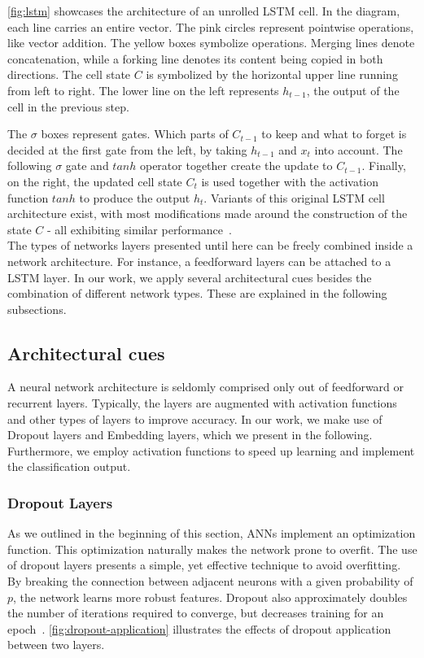 \autoref{fig:lstm} showcases the architecture of an unrolled LSTM cell. In the diagram, each line carries an entire vector. The pink circles represent pointwise operations, like vector addition. The yellow boxes symbolize operations. Merging lines denote concatenation, while a forking line denotes its content being copied in both directions. The cell state $C$ is symbolized by the horizontal upper line running from left to right. The lower line on the left represents $h_{t-1}$, the output of the cell in the previous step.

The $\sigma$ boxes represent gates. Which parts of $C_{t-1}$ to keep and what to forget is decided at the first gate from the left, by taking $h_{t-1}$ and $x_t$ into account. The following $\sigma$ gate and $tanh$ operator together create the update to $C_{t-1}$. Finally, on the right, the updated cell state $C_t$ is used together with the activation function $tanh$ to produce the output $h_t$. Variants of this original LSTM cell architecture exist, with most modifications made around the construction of the state $C$ - all exhibiting similar performance~\cite{greff2017lstm}.\\

The types of networks layers presented until here can be freely combined inside a network architecture.
For instance, a feedforward layers can be attached to a LSTM layer.
In our work, we apply several architectural cues besides the combination of different network types.
These are explained in the following subsections.

\subsection{Architectural cues}\label{sec:bacground:cues}
A neural network architecture is seldomly comprised only out of feedforward or recurrent layers.
Typically, the layers are augmented with activation functions and other types of layers to improve accuracy.
In our work, we make use of Dropout layers and Embedding layers, which we present in the following.
Furthermore, we employ activation functions to speed up learning and implement the classification output.

\subsubsection*{Dropout Layers}
As we outlined in the beginning of this section, ANNs implement an optimization function.
This optimization naturally makes the network prone to overfit.
The use of dropout layers presents a simple, yet effective technique to avoid overfitting.
By breaking the connection between adjacent neurons with a given probability of $p$, the network learns more robust features.
Dropout also approximately doubles the number of iterations required to converge, but decreases training for an epoch~\cite{srivastava2014dropout}.
\autoref{fig:dropout-application} illustrates the effects of dropout application between two layers.

